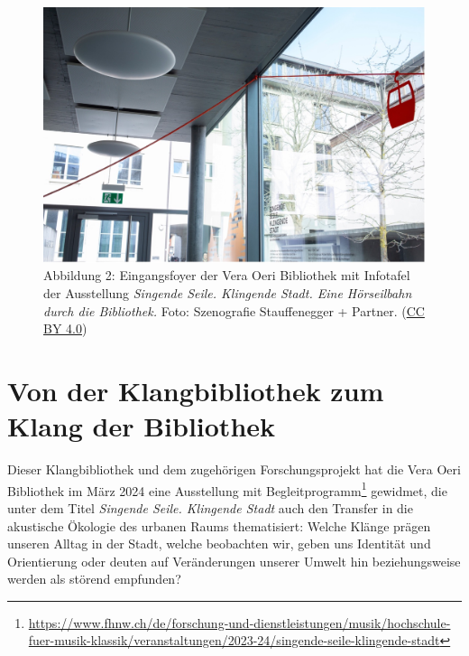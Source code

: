 \documentclass[a4paper,
fontsize=11pt,
oneside,
numbers=noperiodatend,
parskip=half-,
bibliography=totoc,
final
]{scrartcl}
\begin{document}
\begin{figure}
\centering
\includegraphics{img/Abb2.jpg}
\caption{Abbildung 2: Eingangsfoyer der Vera Oeri Bibliothek mit
Infotafel der Ausstellung \emph{Singende Seile. Klingende Stadt. Eine
Hörseilbahn durch die Bibliothek.} Foto: Szenografie Stauffenegger +
Partner. (\href{https://creativecommons.org/licenses/by/4.0/}{CC BY 4.0})}
\end{figure}

\hypertarget{von-der-klangbibliothek-zum-klang-der-bibliothek}{%
\section{Von der Klangbibliothek zum Klang der
Bibliothek}\label{von-der-klangbibliothek-zum-klang-der-bibliothek}}

Dieser Klangbibliothek und dem zugehörigen Forschungsprojekt hat die
Vera Oeri Bibliothek im März 2024 eine Ausstellung mit
Begleitprogramm\footnote{\url{https://www.fhnw.ch/de/forschung-und-dienstleistungen/musik/hochschule-fuer-musik-klassik/veranstaltungen/2023-24/singende-seile-klingende-stadt}}
gewidmet, die unter dem Titel \emph{Singende Seile. Klingende Stadt}
auch den Transfer in die akustische Ökologie des urbanen Raums
thematisiert: Welche Klänge prägen unseren Alltag in der Stadt, welche
beobachten wir, geben uns Identität und Orientierung oder deuten auf
Veränderungen unserer Umwelt hin beziehungsweise werden als störend
empfunden?
\end{document}
